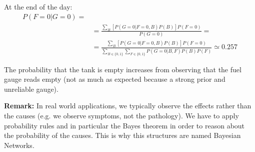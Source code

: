 \begin{itemize}
    At the end of the day:
    \begin{align*}
    P(F=0 | G=0) =\\
    &=\frac{\sum_B [P(G=0 | F=0, B) P(B)] P(F=0)}{P(G=0)} =\\
    &=\frac{\sum_B [P(G=0 | F=0, B) P(B)] P(F=0)}{\sum_{B \in \{0,1\}} \sum_{F \in \{0,1\}} P(G=0 | B, F)P(B)P(F)} \simeq 0.257
    \end{align*}
    
\end{itemize}

The probability that the tank is empty increases from observing that the fuel gauge reads empty (not as much as expected because a strong prior and unreliable gauge). \newline

\textbf{Remark:} In real world applications, we typically observe the effects rather than the causes (e.g. we observe symptoms, not the pathology). We have to apply probability rules and in particular the Bayes theorem in order to reason about the probability of the causes. This is why this structures are named Bayesian Networks. \newline

